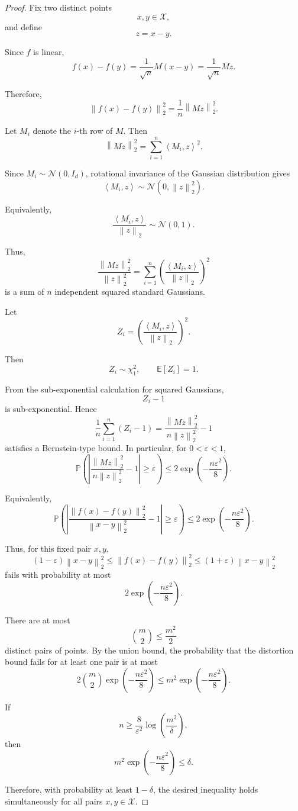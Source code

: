 \documentclass[12pt,oneside]{book}
\numberwithin{equation}{section}
\theoremstyle{definition}
\theoremstyle{plain}
\theoremstyle{remark}
\newcommand{\E}{\mathbb{E}}
\newcommand{\Prob}{\mathbb{P}}
\newcommand{\norm}[1]{\left\lVert #1 \right\rVert}
\newcommand{\inner}[2]{\left\langle #1, #2 \right\rangle}
\newcommand{\Normal}{\mathcal{N}}
\begin{document}
\begin{proof}
Fix two distinct points
\[
x,y\in\mathcal{X},
\]
and define
\[
z=x-y.
\]

Since $f$ is linear,
\[
f(x)-f(y)
=
\frac{1}{\sqrt{n}}M(x-y)
=
\frac{1}{\sqrt{n}}Mz.
\]

Therefore,
\[
\norm{f(x)-f(y)}_2^2
=
\frac{1}{n}\norm{Mz}_2^2.
\]

Let $M_i$ denote the $i$-th row of $M$. Then
\[
\norm{Mz}_2^2
=
\sum_{i=1}^n \inner{M_i}{z}^2.
\]

Since $M_i\sim \Normal(0,I_d)$, rotational invariance of the Gaussian distribution gives
\[
\inner{M_i}{z}
\sim
\Normal(0,\norm{z}_2^2).
\]

Equivalently,
\[
\frac{\inner{M_i}{z}}{\norm{z}_2}
\sim
\Normal(0,1).
\]

Thus,
\[
\frac{\norm{Mz}_2^2}{\norm{z}_2^2}
=
\sum_{i=1}^n
\left(
\frac{\inner{M_i}{z}}{\norm{z}_2}
\right)^2
\]
is a sum of $n$ independent squared standard Gaussians.

Let
\[
Z_i
=
\left(
\frac{\inner{M_i}{z}}{\norm{z}_2}
\right)^2.
\]

Then
\[
Z_i\sim \chi_1^2,
\qquad
\E[Z_i]=1.
\]

From the sub-exponential calculation for squared Gaussians,
\[
Z_i-1
\]
is sub-exponential. Hence
\[
\frac{1}{n}
\sum_{i=1}^n (Z_i-1)
=
\frac{\norm{Mz}_2^2}{n\norm{z}_2^2}
-
1
\]
satisfies a Bernstein-type bound. In particular, for $0<\varepsilon<1$,
\[
\Prob\left(
\left|
\frac{\norm{Mz}_2^2}{n\norm{z}_2^2}
-
1
\right|
\geq
\varepsilon
\right)
\leq
2\exp\left(
-\frac{n\varepsilon^2}{8}
\right).
\]

Equivalently,
\[
\Prob\left(
\left|
\frac{\norm{f(x)-f(y)}_2^2}{\norm{x-y}_2^2}
-
1
\right|
\geq
\varepsilon
\right)
\leq
2\exp\left(
-\frac{n\varepsilon^2}{8}
\right).
\]

Thus, for this fixed pair $x,y$,
\[
(1-\varepsilon)\norm{x-y}_2^2
\leq
\norm{f(x)-f(y)}_2^2
\leq
(1+\varepsilon)\norm{x-y}_2^2
\]
fails with probability at most
\[
2\exp\left(
-\frac{n\varepsilon^2}{8}
\right).
\]

There are at most
\[
\binom{m}{2}
\leq
\frac{m^2}{2}
\]
distinct pairs of points. By the union bound, the probability that the distortion bound fails for at least one pair is at most
\[
2\binom{m}{2}
\exp\left(
-\frac{n\varepsilon^2}{8}
\right)
\leq
m^2
\exp\left(
-\frac{n\varepsilon^2}{8}
\right).
\]

If
\[
n
\geq
\frac{8}{\varepsilon^2}
\log\left(\frac{m^2}{\delta}\right),
\]
then
\[
m^2
\exp\left(
-\frac{n\varepsilon^2}{8}
\right)
\leq
\delta.
\]

Therefore, with probability at least $1-\delta$, the desired inequality holds simultaneously for all pairs $x,y\in\mathcal{X}$.
\end{proof}
\end{document}
